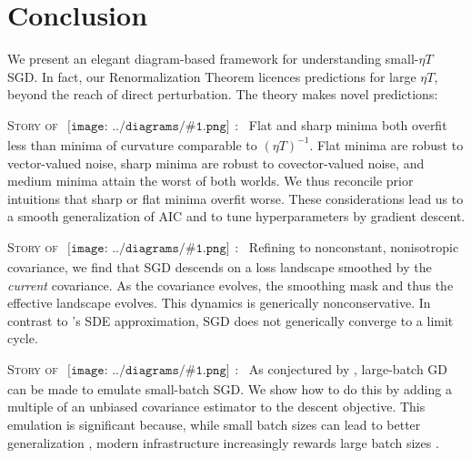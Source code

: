 \documentclass{article}
\theoremstyle{plain}
\theoremstyle{definition}
\newcommand{\sdia}[1]{\begin{gathered}\texttt{[image: ../diagrams/\#1.png]}\end{gathered}}
\begin{document}

\section{Conclusion} \label{sect:concl}


    We present an elegant diagram-based framework for understanding small-$\eta
    T$ SGD.
        In fact, our Renormalization Theorem licences
    predictions for large $\eta T$, beyond the reach of direct perturbation.
    The theory makes novel predictions:

        \textsc{Story of $\sdia{c(01-2)(02-12)}$:~}
        Flat and sharp minima both overfit less than minima of curvature
        comparable to $(\eta T)^{-1}$.  Flat minima are robust to
        vector-valued noise, sharp minima are robust to
        covector-valued noise, and medium minima attain the worst of both
        worlds.  We thus reconcile prior intuitions that sharp \citep{ ke17,
        wa18} or flat \citep{di17, wu18} minima overfit worse.  These
        considerations lead us to a smooth generalization of AIC and to tune
        hyperparameters by gradient descent.

        \textsc{Story of $\sdia{c(01-2-3)(02-12-23)}$:~}
        Refining \citet{we19b} to nonconstant, nonisotropic covariance, we find
        that SGD descends on a loss landscape smoothed by the \emph{current}
        covariance.  As the covariance evolves, the smoothing mask and thus the
        effective landscape evolves.  This dynamics is generically
        nonconservative.  In contrast to \citet{ch18}'s SDE approximation,
        SGD does not generically converge to a limit cycle. 

        \textsc{Story of $\sdia{c(01-2)(01-12)}$:~}
        As conjectured by \citet{ro18}, large-batch GD can be made to emulate
        small-batch SGD.  We show how to do this by adding a multiple of an
        unbiased covariance estimator to the descent objective.  This emulation
        is significant because, while small batch sizes can lead to better
        generalization \citep{bo91}, modern infrastructure increasingly rewards
        large batch sizes \citep{go18}.  
\end{document}
